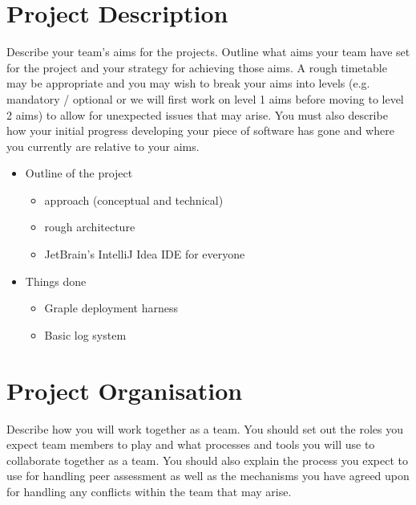 
\section{Project Description} %
Describe your team’s aims for the projects. Outline what aims your team have set for the project and your strategy for achieving those aims. A rough timetable may be appropriate and you may wish to break your aims into levels (e.g. mandatory / optional or we will first work on level 1 aims before moving to level 2 aims) to allow for unexpected issues that may arise. You must also describe how your initial progress developing your piece of software has gone and where you currently are relative to your aims.

\begin{itemize}
	\item Outline of the project
	\begin{itemize}
		\item approach (conceptual and technical)
		\item rough architecture
		\item JetBrain's IntelliJ Idea IDE for everyone
	\end{itemize}
	\item Things done
	\begin{itemize}
		\item Graple deployment harness
		\item Basic log system
	\end{itemize}
\end{itemize}

\section{Project Organisation} %
Describe how you will work together as a team. You should set out the roles you expect team members to play and what processes and tools you will use to collaborate together as a team. You should also explain the process you expect to use for handling peer assessment as well as the mechanisms you have agreed upon for handling any conflicts within the team that may arise.

